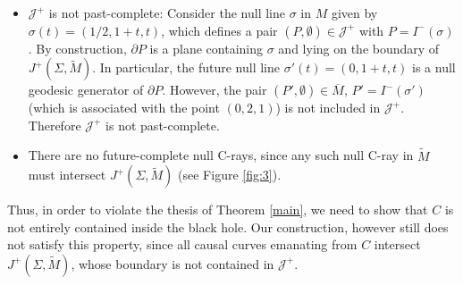 \begin{itemize}
\item $\mathcal{J}^{+}$ is not past-complete: Consider the null line $\sigma$ in $M$ given by $\sigma(t)=(1/2,1+t,t)$, which defines a pair $(P,\emptyset)\in \mathcal{J}^+$ with $P=I^-(\sigma)$. By construction, $\partial P$ is a plane containing $\sigma$ and lying on the boundary of $J^+(\Sigma,\tilde{M})$. In particular, the future null line $\sigma'(t)=(0,1+t,t)$ is a null geodesic generator of $\partial P$. However, the pair $(P',\emptyset)\in \overline{M}$, $P'=I^-(\sigma')$ (which is associated with the point $(0,2,1)$) is not included in $\mathcal{J}^{+}$. Therefore $\mathcal{J}^{+}$ is not past-complete.
  \item There are no future-complete null C-rays, since any such null C-ray in $\tilde{M}$ must intersect $J^{+}(\Sigma,\tilde{M})$ (see Figure \ref{fig:3}).


    \end{itemize}
Thus, in order to violate the thesis of Theorem \ref{main}, we need to show that $C$ is not entirely contained inside the black hole.
Our construction, however still does not satisfy this property, since all causal curves emanating from $C$ intersect $J^{+}(\Sigma,\tilde{M})$, whose boundary is not contained in $\mathcal{J}^+$.

